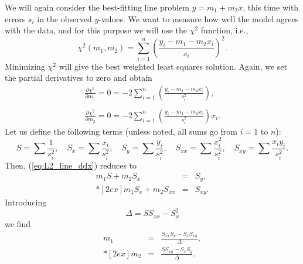 We will again consider the best-fitting line problem $y = m_1 + m_2 x$, this time with errors $s_i$ in the observed $y$-values.  We 
want to measure how well the model agrees with the data, and for this purpose we will use the $\chi^2$ 
function, i.e.,
\begin{equation}
\chi^2(m_1,m_2) = \sum^n_{i=1} \left ( \frac{y_i - m_1 - m_2 x_i}{s_i} \right ) ^2.
\label{eq:L2_line_chi2}
\end{equation}
Minimizing $\chi^2$  will give the best weighted least squares solution.  Again, we set the partial 
derivatives to zero and obtain
\begin{equation}
\begin{array}{c}
\displaystyle \frac{\partial \chi^2}{\partial m_1} = 0 = -2 \sum^n_{i=1} \left( \frac{y_i - m_1 -m_2 x_i}{s^2_i}\right),  \\
\ \\
\displaystyle \frac{\partial \chi^2}{\partial m_2} = 0 = -2 \sum^n_{i=1} \left( \frac{y_i - m_1 -m_2 x_i}{s^2_i}\right) x_i.
\end{array}
\label{eq:L2_line_ddx}
\end{equation}
Let us define the following terms (unless noted, all sums go from $i = 1$ to $n$):
\begin{equation}
S = \sum \frac{1}{s^2_i}, \quad S_x = \sum \frac{x_i}{s^2_i}, \quad S_y = 
\sum \frac{y_i}{s^2_i}, \quad S_{xx} = \sum \frac{x^2_i}{s^2_i}, \quad
S_{xy} = \sum \frac{x_i y_i}{s^2_i}.
\end{equation}
Then, (\ref{eq:L2_line_ddx}) reduces to
\begin{equation}
\begin{array}{rcl}
\displaystyle
m_1 S  + m_2 S_x & = & S_y, \\*[2ex]
m_1 S_x + m_2 S_{xx} & = & S_{xy}.
\end{array}
\end{equation} 	 
Introducing 
\begin{equation}
\Delta = SS_{xx} - S ^2 _x
\end{equation}
we find
\begin{equation}
\begin{array}{rcl}
m_1 & = & \displaystyle \frac{S_{xx}S_y - S_x S_{xy}}{\Delta},\\*[2ex]
m_2 & = & \displaystyle \frac{S S_{xy}- S_x S_{y}}{\Delta}.
\end{array}
\label{eq:L2_sol_ab}
\end{equation}
